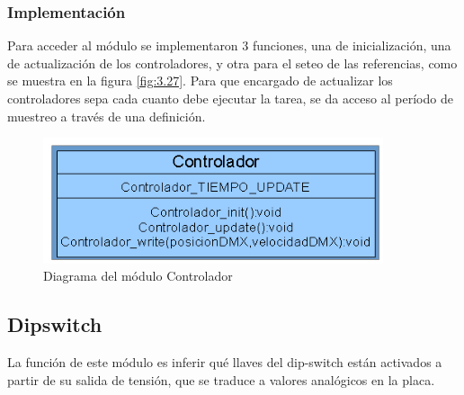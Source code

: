 \subsubsection{Implementación}

Para acceder al módulo se implementaron 3 funciones, una de inicialización, una de actualización de los controladores, y otra para el seteo de las referencias, como se muestra en la figura \ref{fig:3.27}. Para que encargado de actualizar los controladores sepa cada cuanto debe ejecutar la tarea, se da acceso al período de muestreo a través de una definición.

\begin{figure}[!ht]
	\centering
	\includegraphics[width=10cm,scale=1]{resources/3_27-moduloControlador.png}
	\caption{Diagrama del módulo Controlador}
	\label{fig:\thefigure}
\end{figure}

\subsection{Dipswitch}
La función de este módulo es inferir qué llaves del dip-switch están activados a partir de su salida de tensión, que se traduce a valores analógicos en la placa. 

